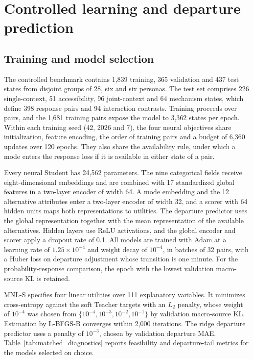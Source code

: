 \section{Controlled learning and departure prediction}
\label{sec:supp_controlled}
\subsection{Training and model selection}
The controlled benchmark contains 1,839 training, 365 validation and 437 test states from disjoint groups of 28, six and six personas. The test set comprises 226 single-context, 51 accessibility, 96 joint-context and 64 mechanism states, which define 398 response pairs and 94 interaction contrasts. Training proceeds over pairs, and the 1,681 training pairs expose the model to 3,362 states per epoch. Within each training seed (42, 2026 and 7), the four neural objectives share initialization, feature encoding, the order of training pairs and a budget of 6,360 updates over 120 epochs. They also share the availability rule, under which a mode enters the response loss if it is available in either state of a pair.

Every neural Student has 24,562 parameters. The nine categorical fields receive eight-dimensional embeddings and are combined with 17 standardized global features in a two-layer encoder of width 64. A mode embedding and the 12 alternative attributes enter a two-layer encoder of width 32, and a scorer with 64 hidden units maps both representations to utilities. The departure predictor uses the global representation together with the mean representation of the available alternatives. Hidden layers use ReLU activations, and the global encoder and scorer apply a dropout rate of 0.1. All models are trained with Adam at a learning rate of $1.25\times10^{-4}$ and weight decay of $10^{-4}$, in batches of 32 pairs, with a Huber loss on departure adjustment whose transition is one minute. For the probability-response comparison, the epoch with the lowest validation macro-source KL is retained.

MNL-S specifies four linear utilities over 111 explanatory variables. It minimizes cross-entropy against the soft Teacher targets with an $L_2$ penalty, whose weight of $10^{-4}$ was chosen from $\{10^{-4},10^{-3},10^{-2},10^{-1}\}$ by validation macro-source KL. Estimation by L-BFGS-B converges within 2,000 iterations. The ridge departure predictor uses a penalty of $10^{-3}$, chosen by validation departure MAE. Table~\ref{tab:matched_diagnostics} reports feasibility and departure-tail metrics for the models selected on choice.


